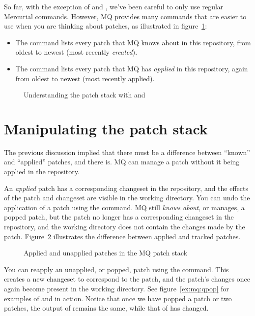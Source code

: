 So far, with the exception of  and , we've
been careful to only use regular Mercurial commands.  However, MQ
provides many commands that are easier to use when you are thinking
about patches, as illustrated in figure~\ref{ex:mq:qseries}:

\begin{itemize}
\item The  command lists every patch that MQ knows
  about in this repository, from oldest to newest (most recently
  \emph{created}).
\item The  command lists every patch that MQ has
  \emph{applied} in this repository, again from oldest to newest (most
  recently applied).
\end{itemize}

\begin{figure}[ht]
  \caption{Understanding the patch stack with  and
    }
  \label{ex:mq:qseries}
\end{figure}

\section{Manipulating the patch stack}

The previous discussion implied that there must be a difference
between ``known'' and ``applied'' patches, and there is.  MQ can
manage a patch without it being applied in the repository.

An \emph{applied} patch has a corresponding changeset in the
repository, and the effects of the patch and changeset are visible in
the working directory.  You can undo the application of a patch using
the  command.  MQ still \emph{knows about}, or manages, a
popped patch, but the patch no longer has a corresponding changeset in
the repository, and the working directory does not contain the changes
made by the patch.  Figure~\ref{fig:mq:stack} illustrates the
difference between applied and tracked patches.

\begin{figure}[ht]
  \centering
  \caption{Applied and unapplied patches in the MQ patch stack}
  \label{fig:mq:stack}
\end{figure}

You can reapply an unapplied, or popped, patch using the 
command.  This creates a new changeset to correspond to the patch, and
the patch's changes once again become present in the working
directory.  See figure~\ref{ex:mq:qpop} for examples of 
and  in action.  Notice that once we have popped a patch
or two patches, the output of  remains the same, while
that of  has changed.

